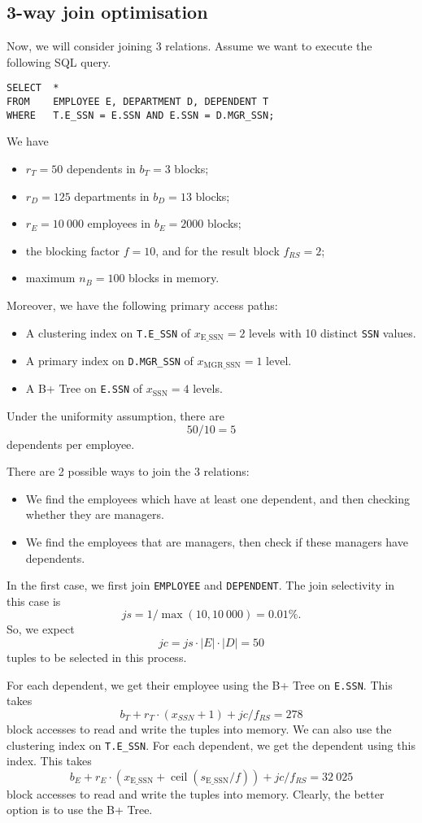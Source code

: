 \documentclass[a4paper, openany]{memoir}
\theoremstyle{definition}
\theoremstyle{plain}
\begin{document}
\subsection{3-way join optimisation}
Now, we will consider joining 3 relations. Assume we want to execute the following SQL query.
\begin{verbatim}
SELECT  *
FROM    EMPLOYEE E, DEPARTMENT D, DEPENDENT T
WHERE   T.E_SSN = E.SSN AND E.SSN = D.MGR_SSN;
\end{verbatim}
We have
\begin{itemize}
    \item $r_T = 50$ dependents in $b_T = 3$ blocks;
    \item $r_D = 125$ departments in $b_D = 13$ blocks;
    \item $r_E = 10 \ 000$ employees in $b_E = 2000$ blocks;
    \item the blocking factor $f = 10$, and for the result block $f_{RS} = 2$;
    \item maximum $n_B = 100$ blocks in memory.
\end{itemize}
Moreover, we have the following primary access paths:
\begin{itemize}
    \item A clustering index on \texttt{T.E\_SSN} of $x_{\text{E\_SSN}} = 2$ levels with 10 distinct \texttt{SSN} values.
    \item A primary index on \texttt{D.MGR\_SSN} of $x_{\text{MGR\_SSN}} = 1$ level.
    \item A B+ Tree on \texttt{E.SSN} of $x_{\text{SSN}} = 4$ levels.
\end{itemize}
Under the uniformity assumption, there are
\[50/10 = 5\]
dependents per employee.

There are 2 possible ways to join the 3 relations:
\begin{itemize}
    \item We find the employees which have at least one dependent, and then checking whether they are managers.
    \item We find the employees that are managers, then check if these managers have dependents.
\end{itemize}
In the first case, we first join \texttt{EMPLOYEE} and \texttt{DEPENDENT}. The join selectivity in this case is
\[\textit{js} = 1/\max(10, 10 \ 000) = 0.01\%.\]
So, we expect
\[\textit{jc} = \textit{js} \cdot |E| \cdot |D| = 50\]
tuples to be selected in this process. 

For each dependent, we get their employee using the B+ Tree on \texttt{E.SSN}. This takes
\[b_T + r_T \cdot (x_{SSN} + 1) + \textit{jc}/f_{RS} = 278\]
block accesses to read and write the tuples into memory. We can also use the clustering index on \texttt{T.E\_SSN}. For each dependent, we get the dependent using this index. This takes
\[b_E + r_E \cdot (x_{\text{E\_SSN}} + \operatorname{ceil}(s_{\text{E\_SSN}} / f)) + \textit{jc}/f_{RS} = 32 \ 025\]
block accesses to read and write the tuples into memory. Clearly, the better option is to use the B+ Tree.
\end{document}
